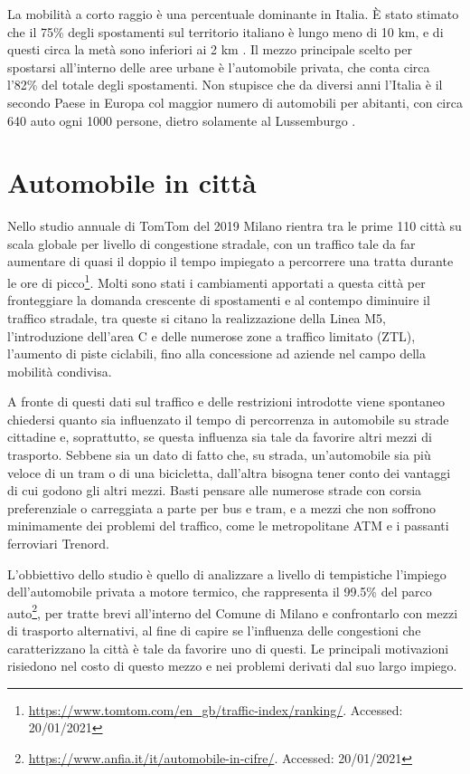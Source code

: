 La mobilità a corto raggio è una percentuale dominante in Italia. È stato stimato che il 75\% degli spostamenti sul territorio italiano è lungo meno di 10 km, e di questi circa la metà sono inferiori ai 2 km \cite{isfortaudimob}. Il mezzo principale scelto per spostarsi all'interno delle aree urbane è l'automobile privata, che conta circa l'82\% del totale degli spostamenti. Non stupisce che da diversi anni l'Italia è il secondo Paese in Europa col maggior numero di automobili per abitanti, con circa 640 auto ogni 1000 persone, dietro solamente al Lussemburgo \cite{eurostatcars}.

\section{Automobile in città}

Nello studio annuale di TomTom del 2019 Milano rientra tra le prime 110 città su scala globale per livello di congestione stradale, con un traffico tale da far aumentare di quasi il doppio il tempo impiegato a percorrere una tratta durante le ore di picco\footnote{\url{https://www.tomtom.com/en_gb/traffic-index/ranking/}. Accessed: 20/01/2021}. Molti sono stati i cambiamenti apportati a questa città per fronteggiare la domanda crescente di spostamenti e al contempo diminuire il traffico stradale, tra queste si citano la realizzazione della Linea M5, l'introduzione dell'area C e delle numerose zone a traffico limitato (ZTL), l'aumento di piste ciclabili, fino alla concessione ad aziende nel campo della mobilità condivisa.

A fronte di questi dati sul traffico e delle restrizioni introdotte viene spontaneo chiedersi quanto sia influenzato il tempo di percorrenza in automobile su strade cittadine e, soprattutto, se questa influenza sia tale da favorire altri mezzi di trasporto. Sebbene sia un dato di fatto che, su strada, un'automobile sia più veloce di un tram o di una bicicletta, dall'altra bisogna tener conto dei vantaggi di cui godono gli altri mezzi. Basti pensare alle numerose strade con corsia preferenziale o carreggiata a parte per bus e tram, e a mezzi che non soffrono minimamente dei problemi del traffico, come le metropolitane ATM e i passanti ferroviari Trenord.

L'obbiettivo dello studio è quello di analizzare a livello di tempistiche l'impiego dell'automobile privata a motore termico, che rappresenta il 99.5\% del parco auto\footnote{\label{footanfia}\url{https://www.anfia.it/it/automobile-in-cifre/}. Accessed: 20/01/2021}, per tratte brevi all'interno del Comune di Milano e confrontarlo con mezzi di trasporto alternativi, al fine di capire se l'influenza delle congestioni che caratterizzano la città è tale da favorire uno di questi. Le principali motivazioni risiedono nel costo di questo mezzo e nei problemi derivati dal suo largo impiego.

